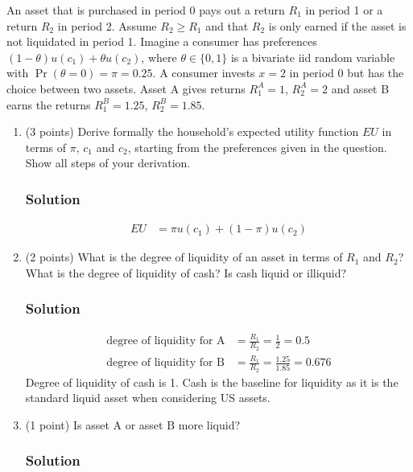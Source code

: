 \documentclass[12pt]{article}
\begin{document}
An asset that is purchased in period 0 pays out a return $R_1$ in period 1 or a return $R_2$ in period 2. Assume $R_2 \geq R_1$ and that $R_2$ is only earned if the asset is not liquidated in period 1. Imagine a consumer has preferences $(1 - \theta)u(c_1) + \theta u(c_2)$, where $\theta \in \{0, 1\}$ 
is a bivariate iid random variable with $\Pr(\theta = 0) = \pi = 0.25$. A consumer invests $x = 2$ in period 0 but has the choice between two assets. Asset A gives returns $R_{1}^A = 1$, $R_{2}^A = 2$ and asset B earns the returns $R_{1}^B = 1.25$, $R_{2}^B = 1.85$.

\begin{enumerate}[label=(\alph*)]
    \item (3 points) Derive formally the household’s expected utility function $EU$ in terms of $\pi$, $c_1$ and $c_2$, starting from the preferences given in the question. Show all steps of your derivation.

    \subsubsection*{Solution}
    \begin{align*}
         EU &= \pi u(c_1) + (1-\pi) u(c_2)
    \end{align*}

    \item (2 points) What is the degree of liquidity of an asset in terms of $R_1$ and $R_2$? What is the degree of liquidity of cash? Is cash liquid or illiquid?
    \subsubsection*{Solution}

    \begin{align*}
        \text{degree of liquidity for A} &= \frac{R_1}{R_2} = \frac{1}{2} = 0.5
        \\ \text{degree of liquidity for B} &= \frac{R_1}{R_2} = \frac{1.25}{1.85} = 0.676
    \end{align*}
    Degree of liquidity of cash is 1. Cash is the baseline for liquidity as it is the standard liquid asset when considering US assets. 
    

    \item (1 point) Is asset A or asset B more liquid?
    \subsubsection*{Solution}


\end{enumerate}
\end{document}

